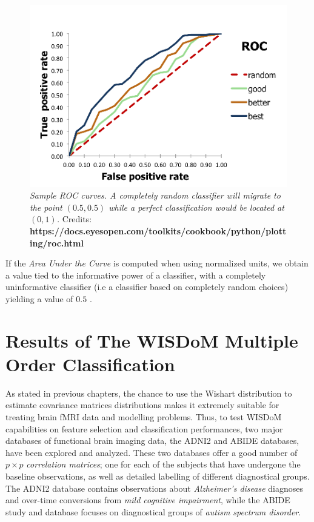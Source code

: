 \documentclass[12pt,openright,twoside,a4paper]{book}
\begin{document}
\begin{figure}[!h]
\centering
\includegraphics[scale=0.65]{roc-theory-small}
\caption{\textit{Sample ROC curves. A completely random classifier will migrate to the point $(0.5,0.5)$ while a perfect classification would be located at $(0,1)$.}
Credits: \textbf{https://docs.eyesopen.com/toolkits/cookbook/python/plotting/roc.html}}
\label{ADNI-roc}
\end{figure}

If the \textit{Area Under the Curve} is computed when using normalized units, we obtain a value tied to the informative power of a classifier, with a completely uninformative classifier (i.e a classifier based on completely random choices) yielding a value of $0.5$ \cite{ROC}.


\chapter{Results of The WISDoM Multiple Order Classification}

As stated in previous chapters, the chance to use the Wishart distribution to estimate covariance matrices distributions makes it extremely suitable for treating brain fMRI data and modelling problems.
Thus, to test WISDoM capabilities on feature selection and classification performances, two major databases of functional brain imaging data, the ADNI2 and ABIDE databases, have been explored and analyzed.
These two databases offer a good number of $p\times p$ \textit{correlation matrices}; one for each of the subjects that have undergone the baseline observations, as well as detailed labelling of different diagnostical groups.
The ADNI2 database contains observations about \textit{Alzheimer's disease} diagnoses and over-time conversions from \textit{mild cognitive impairment}, while the ABIDE study and database focuses on diagnostical groups of \textit{autism spectrum disorder}.
\end{document}
